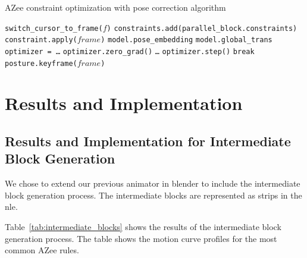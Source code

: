 \documentclass[../../main.tex]{subfiles}
\begin{document}
\begin{algorithm}
  \caption{AZee constraint optimization with pose correction algorithm}
  \label{alg:pose_correction}
  \begin{algorithmic}[1]
      \State \texttt{switch\_cursor\_to\_frame($f$)}
          \State \texttt{constraints.add(parallel\_block.constraints)}
      \EndFor
          \State \texttt{constraint.apply($frame$)}
      \EndFor
      \State \texttt{model.pose\_embedding}
      \State \texttt{model.global\_trans}
      \State \texttt{optimizer = \dots}
          \State \texttt{optimizer.zero\_grad()}
          \State \texttt{\dots}
          \State \texttt{optimizer.step()}
           \State \texttt{break} \EndIf
      \EndFor
      \State \texttt{posture.keyframe($frame$)}
  \EndFor
  \end{algorithmic}
  \end{algorithm}

\section{Results and Implementation}
\label{ch:intermediate_blocks_pose_correction:results}

\subsection{Results and Implementation for Intermediate Block Generation}
\label{ch:intermediate_blocks_pose_correction:results:intermediate_block_generation}

We chose to extend our previous animator in blender to include the intermediate block generation process. The intermediate blocks are represented as strips in the \gls{nle}.

Table~\ref{tab:intermediate_blocks} shows the results of the intermediate block generation process. The table shows the motion curve profiles for the most common AZee rules.
\end{document}
